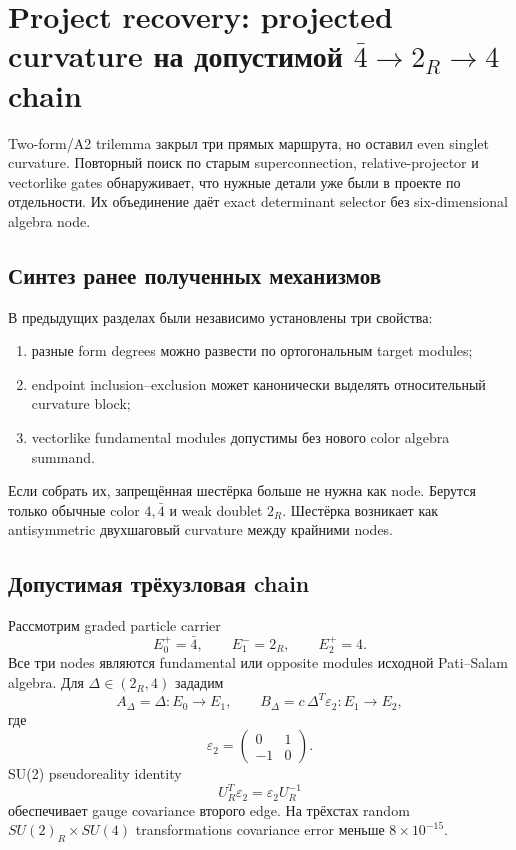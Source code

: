 \chapter{Project recovery: projected curvature на допустимой \texorpdfstring{\(\bar4\to2_R\to4\)}{4bar-to-2R-to-4} chain}

Two-form/A2 trilemma закрыл три прямых маршрута, но оставил even singlet
curvature. Повторный поиск по старым superconnection, relative-projector и
vectorlike gates обнаруживает, что нужные детали уже были в проекте по
отдельности. Их объединение даёт exact determinant selector без
six-dimensional algebra node.

\section{Синтез ранее полученных механизмов}

В предыдущих разделах были независимо установлены три свойства:
\begin{enumerate}
 \item разные form degrees можно развести по ортогональным target modules;
 \item endpoint inclusion--exclusion может канонически выделять относительный
 curvature block;
 \item vectorlike fundamental modules допустимы без нового color algebra
 summand.
\end{enumerate}
Если собрать их, запрещённая шестёрка больше не нужна как node. Берутся
только обычные color \(4,\bar4\) и weak doublet \(2_R\). Шестёрка возникает
как antisymmetric двухшаговый curvature между крайними nodes.

\section{Допустимая трёхузловая chain}

Рассмотрим graded particle carrier
\begin{equation}
 E_0^+=\bar4,
 \qquad
 E_1^-=2_R,
 \qquad
 E_2^+=4.
 \label{eq:ps-valid-module-chain}
\end{equation}
Все три nodes являются fundamental или opposite modules исходной
Pati--Salam algebra. Для \(\Delta\in(2_R,4)\) зададим
\begin{equation}
 A_\Delta=\Delta:E_0\longrightarrow E_1,
 \qquad
 B_\Delta=c\,\Delta^T\varepsilon_2:E_1\longrightarrow E_2,
 \label{eq:ps-valid-module-edges}
\end{equation}
где
\begin{equation}
 \varepsilon_2=
 \begin{pmatrix}0&1\\-1&0\end{pmatrix}.
\end{equation}
SU(2) pseudoreality identity
\begin{equation}
 U_R^T\varepsilon_2=\varepsilon_2U_R^{-1}
\end{equation}
обеспечивает gauge covariance второго edge. На трёхстах random
\(SU(2)_R\times SU(4)\) transformations covariance error меньше
\(8\times10^{-15}\).

